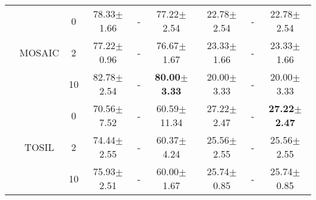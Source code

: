 \begin{table}[t]
{\begin{tabular}{|c|c|c|c|c|c|c|c|c|}
  \hhline{|=========|}
  \multirow{6}{*}{\rotatebox[origin=c]{90}{Press-Button}} & \multirow{3}{*}{MOSAIC} & 0 & 78.33$\pm$1.66 & - & 77.22$\pm$2.54 & 22.78$\pm$2.54 & - & 22.78$\pm$2.54 \\ 
  \cline{3-9}
   &  & 2 & 77.22$\pm$0.96 & - & 76.67$\pm$1.67 & 23.33$\pm$1.66 & - & 23.33$\pm$1.66 \\ 
  \cline{3-9}
   &  & 10 & 82.78$\pm$2.54 & - & \textbf{80.00$\pm$3.33} & 20.00$\pm$3.33 & - & 20.00$\pm$3.33 \\ 
  \cline{2-9}
   & \multirow{3}{*}{TOSIL} & 0 & 70.56$\pm$7.52 & - & 60.59$\pm$11.34 & 27.22$\pm$2.47 & - & \textbf{27.22$\pm$2.47} \\ 
  \cline{3-9}
   &  & 2 & 74.44$\pm$2.55 & - & 60.37$\pm$4.24 & 25.56$\pm$2.55 & - & 25.56$\pm$2.55 \\ 
  \cline{3-9}
   &  & 10 & 75.93$\pm$ 2.51 & - & 60.00$\pm$ 1.67 & 25.74$\pm$ 0.85 & - & 25.74$\pm$ 0.85 \\
  \hline
  \end{tabular}
  }
  \end{table}